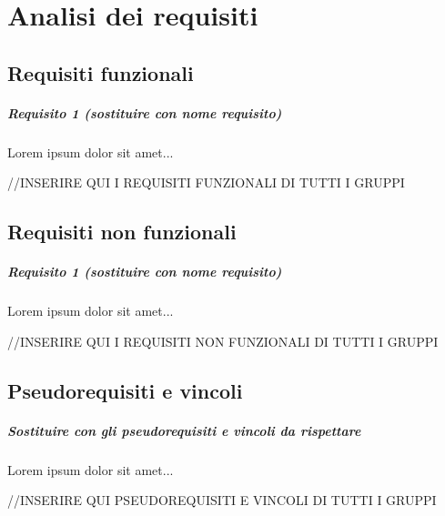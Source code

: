
\chapter{Analisi dei requisiti}
\label{ref:requisiti1}


\section{Requisiti funzionali}

\paragraph{Requisito 1 (sostituire con nome requisito) \\} 
Lorem ipsum dolor sit amet...

//INSERIRE QUI I REQUISITI FUNZIONALI DI TUTTI I GRUPPI

\section{Requisiti non funzionali}

\paragraph{Requisito 1 (sostituire con nome requisito) \\} 
Lorem ipsum dolor sit amet...

//INSERIRE QUI I REQUISITI NON FUNZIONALI DI TUTTI I GRUPPI

\section{Pseudorequisiti e vincoli}
\paragraph{Sostituire con gli pseudorequisiti e vincoli da rispettare \\}
Lorem ipsum dolor sit amet...

//INSERIRE QUI PSEUDOREQUISITI E VINCOLI DI TUTTI I GRUPPI

\clearpage